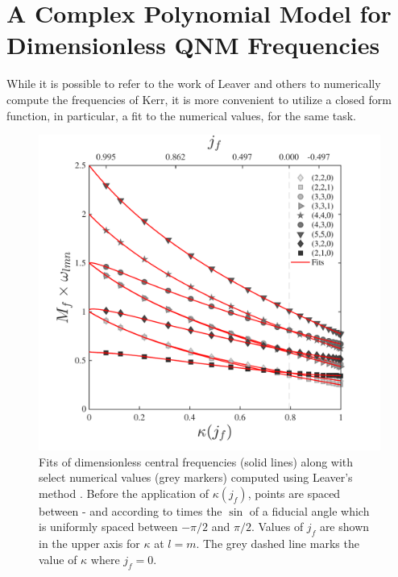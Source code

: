 \documentclass[twocolumn,prd,floatfix,preprintnumbers,a4paper,nofootinbib,superscriptaddress]{revtex4-1}
\def\j{j_f}
\def\CwFitCalibrationRegion{\red{0.995} }
\begin{document}
\section{A Complex Polynomial Model for Dimensionless QNM Frequencies}
\label{app:cwmodel}
%
\par While it is possible to refer to the work of Leaver and others to numerically compute the \qnm{} frequencies of Kerr, it is more convenient to utilize a closed form function, in particular, a fit to the numerical values, for the same task.
%
\begin{figure}[htb]
	\vspace{0.15cm}
	\includegraphics[width=\figfactor\textwidth]{fits_w.pdf}
	\caption{ Fits of dimensionless \qnm{} central frequencies (solid lines) along with select numerical values (grey markers) computed using Leaver's method \cite{Leaver85}. Before the application of $\kappa(\j{})$, points are spaced between -\CwFitCalibrationRegion and \CwFitCalibrationRegion according to \CwFitCalibrationRegion times the $\sin$ of a fiducial angle which is uniformly spaced between $-\pi/2$ and $\pi/2$. Values of $\j{}$ are shown in the upper axis for $\kappa$ at $l=m$. The grey dashed line marks the value of $\kappa$ where $\j{}=0$.}
	\label{fig:wfits}
\end{figure}
\end{document}
